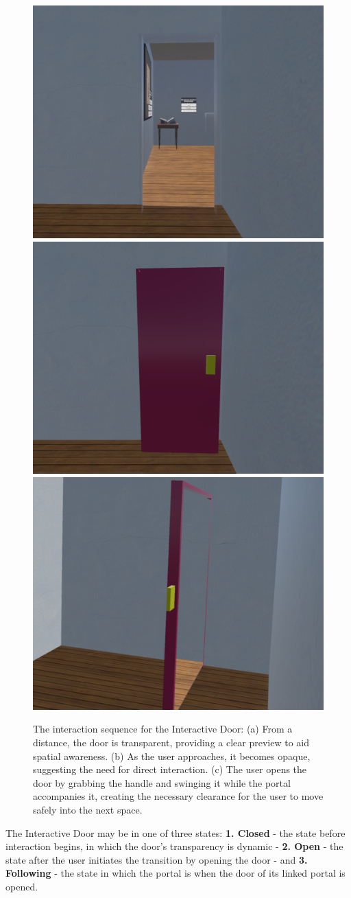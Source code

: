 \begin{figure}[t]
  \centering
  \mbox{} \hfill
  \includegraphics[width=.45\linewidth]{NOVAthesisFiles/Images/screenshots/CaptureDoorA.PNG}
  \hfill
  \includegraphics[width=.45\linewidth]{NOVAthesisFiles/Images/screenshots/CaptureDoorClosed.PNG}
  \hfill \mbox{}
  \includegraphics[width=.45\linewidth]{NOVAthesisFiles/Images/screenshots/CaptureDoorC.PNG}
  \caption{The interaction sequence for the Interactive Door: (a) From a distance, the door is transparent, providing a clear preview to aid spatial awareness. (b) As the user approaches, it becomes opaque, suggesting the need for direct interaction. (c) The user opens the door by grabbing the handle and swinging it while the portal accompanies it, creating the necessary clearance for the user to move safely into the next space.}
  \label{fig:int-door-sc}
\end{figure}

The Interactive Door may be in one of three states: \textbf{1. Closed} - the state before interaction begins, in which the door's transparency 
is dynamic - \textbf{2. Open} - the state after the user initiates the transition by opening the door - and \textbf{3. Following} - the state in 
which the portal is when the door of its linked portal is opened.

